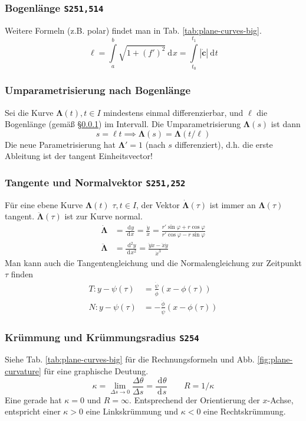 \documentclass[a4paper, twocolumn]{article}
\numberwithin{equation}{subsection}
\newcommand{\dd}[2][]{\ensuremath{~\mathrm{d}^{#1} #2}}
\newcommand{\deriv}[3][]{\ensuremath{\frac{\dd[#1]{#2}}{\dd[]{#3^{#1}}}}}
\renewcommand{\vec}[1]{\ensuremath{\bm{#1}}}
\newcommand{\brpage}[1]{\textcolor{red!70!black}{\small\texttt{S#1}}}
\begin{document}
\subsubsection{Bogenl\"ange \brpage{251,514}} \label{sec:arc-length}
Weitere Formeln (z.B. polar) findet man in Tab. \ref{tab:plane-curves-big}.
\[
    \ell = \int\limits_a^b \sqrt{1 + (f')^2} \dd{x} 
    = \int\limits_{t_0}^{t_1} |\vec{\dot{c}}| \dd{t}
\]

\subsubsection{Umparametrisierung nach Bogenl\"ange}
Sei die Kurve \(\vec{\Lambda}(t), t \in I\) mindestens einmal differenzierbar, und \(\ell\) die Bogenl\"ange (gem\"a{\ss} \S\ref{sec:arc-length}) im Intervall. Die Umparametrisierung \(\vec{\Lambda}(s)\) ist dann
\[
    s = \ell t \implies \vec{\Lambda}(s) = \vec{\Lambda}(t/\ell)
\]
Die neue Parametrisierung hat \(\vec{\Lambda}' = 1\) (nach \(s\) differenziert), d.h. die erste Ableitung ist der tangent Einheitsvector!

\subsubsection{Tangente und Normalvektor \brpage{251,252}}
F\"ur eine ebene Kurve \(\vec{\Lambda}(t)\) \(\tau, t \in I\), der Vektor \(\vec{\dot\Lambda}(\tau)\) ist immer an \(\vec{\Lambda}(\tau)\) tangent. \(\vec{\ddot{\Lambda}}(\tau)\) ist zur Kurve normal.
\begin{align*}
    \vec{\dot{\Lambda}}
    &= \deriv{y}{x} 
    = \frac{\dot{y}}{\dot{x}} 
    = \frac{r'\sin\varphi + r\cos\varphi}{r'\cos\varphi - r\sin\varphi}
    \\[.9em]
    \vec{\ddot{\Lambda}}
    &= \deriv[2]{y}{x}
    = \frac{\ddot{y}\dot{x} - \ddot{x}\dot{y}}{\dot{x}^3}
\end{align*}
Man kann auch die Tangentengleichung und die Normalengleichung zur Zeitpunkt \(\tau\) finden
\begin{align*}
    T: y - \psi(\tau) &= \frac{\dot{\psi}}{\dot{\phi}}(x - \phi(\tau)) \\
    N: y - \psi(\tau) &= -\frac{\dot{\phi}}{\dot{\psi}}(x - \phi(\tau))
\end{align*}

\subsubsection{Kr\"ummung und Kr\"ummungsradius \brpage{254}}
Siehe Tab. \ref{tab:plane-curves-big} f\"ur die Rechnungsformeln und Abb. \ref{fig:plane-curvature} f\"ur eine graphische Deutung.
\[
    \kappa 
    = \lim_{\Delta s\to 0} \frac{\Delta \theta}{\Delta s}
    = \deriv{\theta}{s} 
    \qquad
    R = 1/\kappa
\]
Eine gerade hat \(\kappa = 0\) und \(R = \infty\).
Entsprechend der Orientierung der \(x\)-Achse, entspricht einer \(\kappa > 0\) eine Linkskr\"ummung und \(\kappa < 0\) eine Rechtskr\"ummung.
\end{document}
